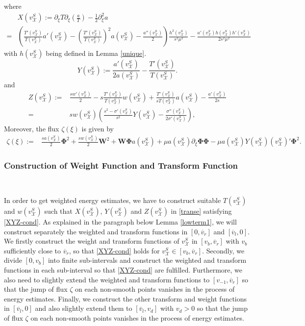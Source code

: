 \documentclass[12pt,reqno]{amsart}
\numberwithin{equation}{section}
\def\p{\partial}
\def\ph{\mathbf{\Phi}}
\def\w{\mathbf{W}}
\def\vsx{v^S_{\mathcal{X}}}
\def\avl{\overline{v}_l}
\def\avr{\overline{v}_r}
\begin{document}
where
\begin{align}\label{X-form}
	&X(\vsx):=\p_{\xi}T\p_{\xi}\left(\frac{a}{T}\right)-\frac{1}{2}\p_{\xi}^2a\nonumber\\
	=&\left(\frac{T'(\vsx)}{T(\vsx)}a'(\vsx)-\left(\frac{T'(\vsx)}{T(\vsx)}\right)^2a(\vsx)-\frac{a''(\vsx)}{2}\right)\frac{h^2(\vsx)}{s^2\mu^2}-\frac{a'(\vsx)h(\vsx)h'(\vsx)}{2s^2\mu^2}
\end{align}
with $h(\vsx)$ being defined in Lemma \ref{unique}.
\begin{equation}\label{Y-form}
	Y(\vsx):=\frac{a'(\vsx)}{2a(\vsx)}-\frac{T'(\vsx)}{T(\vsx)}.
\end{equation}
and 
\begin{align}\label{Z-form}
	Z(\vsx):=&\frac{sw'(\vsx)}{2}-s\frac{T'(\vsx)}{T(\vsx)}w(\vsx)+\frac{T'(\vsx)}{sT(\vsx)}a(\vsx)-\frac{a'(\vsx)}{2s}\nonumber\\
	=&sw(\vsx)\left(\frac{s^2-\sigma'(\vsx)}{s^2}Y(\vsx)-\frac{\sigma''(\vsx)}{2\sigma'(\vsx)}\right),
\end{align}
Moreover, the flux $\zeta(\xi)$ is given by 
\begin{align}\label{zeta}
	\zeta(\xi):=&\frac{s a(\vsx)}{2}\ph^2+\frac{sw(\vsx)}{2}\w^2+\w\ph a(\vsx)+\mu a(\vsx)\p_{\xi}\ph\ph-\mu a(\vsx)Y(\vsx)(\vsx)'\ph^2.
\end{align}
\subsubsection{Construction of Weight Function and Transform Function}\label{construction of function}

\

In order to get weighted energy estimates, we have to construct suitable $T(\vsx)$ and $w(\vsx)$ such that $X(\vsx)$, $Y(\vsx)$ and $Z(\vsx)$ in \eqref{transe} satisfying \eqref{XYZ-cond}. As explained in the paragraph below Lemma \ref{lowterm1}, we will construct separately the weighted and transform functions in $[0,\avr]$ and $[\avl,0]$. We firstly construct the weight and transform functions of $\vsx$ in $[v_b,\avr]$ with $v_b$ sufficiently close to $\avr$, so that \eqref{XYZ-cond} holds for $\vsx\in [v_b,\avr]$. Secondly, we divide $[0,v_b]$ into finite sub-intervals and construct the weighted and transform functions in each sub-interval so that \eqref{XYZ-cond} are fulfilled. Furthermore, we also need to slightly extend the weighted and transform functions to $[v_{-1},\avr]$ so that the jump of flux $\zeta$ on each non-smooth points vanishes in the process of energy estimates. Finally, we construct the other transform and weight functions in $[\avl,0]$ and also slightly extend them to $[\avl,v_d]$ with $v_d>0$ so that the jump of flux $\zeta$ on each non-smooth points vanishes in the process of energy estimates.
\end{document}
